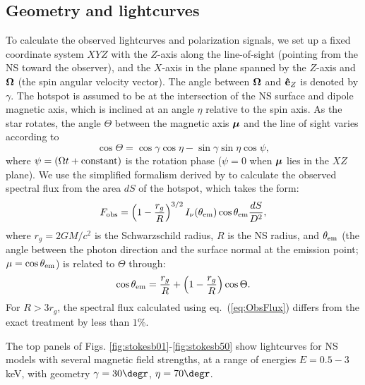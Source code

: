 \documentclass[useAMS,onecolumn,usenatbib,usegraphicx]{mn2e}
\def\be{\begin{equation}}
\def\ee{\end{equation}}
\begin{document}
\subsection{Geometry and lightcurves}
\label{subsect:LCurves}

\def\bmu{{\mbox{\boldmath $\mu$}}}

To calculate the observed lightcurves and polarization signals, we
set up a fixed coordinate system $XYZ$ with the $Z$-axis along the
line-of-sight (pointing from the NS toward the observer), 
and the $X$-axis in the plane spanned
by the $Z$-axis and ${\bf\Omega}$ (the spin angular velocity
vector). The angle between ${\bf\Omega}$ and ${\bf\hat{e}}_Z$ is denoted by
$\gamma$.  The hotspot is assumed to be at the intersection of the NS
surface and dipole magnetic axis, which is inclined at an angle $\eta$
relative to the spin axis.  As the star rotates, the angle $\Theta$ 
between the magnetic axis $\bmu$ and the line of sight varies according to
\be
\cos\Theta=\cos\gamma\cos\eta-\sin\gamma\sin\eta\cos\psi,
\label{eq:Theta}
\ee
where $\psi=(\Omega t+{\rm constant})$ is the rotation phase ($\psi=0$
when $\bmu$ lies in the $XZ$ plane).
We use the simplified formalism derived by \citet[][]{Beloborodov02a} to 
calculate the observed spectral flux from the area $dS$ of the hotspot, 
which takes the form:
\begin{eqnarray}
\label{eq:ObsFlux}
F_{\rm obs} = \left(1-{r_g\over R}\right)^{3/2}
I_{\nu}(\theta_{\rm em})\cos\theta_{\rm em} {dS\over D^2},
\end{eqnarray}
where $r_g=2GM/c^2$ is the Schwarzschild radius, $R$ is the NS radius, 
and $\theta_{\rm em}$ (the angle between the photon direction and the surface
normal at the emission point; $\mu=\cos\theta_{\rm em}$)
is related to $\Theta$ through:
\begin{eqnarray}
\label{eq:LBend}
\cos\theta_{\rm em}={r_g\over R}+\left(1-{r_g\over R}\right)\cos\Theta.
\end{eqnarray}
For $R>3 r_g$, the spectral flux calculated using eq.~(\ref{eq:ObsFlux})
differs from the exact treatment \citep[see][]{Pechenicketal83a} by
less than $1$\%.

The top panels of Figs. \ref{fig:stokesb01}-\ref{fig:stokesb50} show
lightcurves for NS models with several magnetic field strengths, at a
range of energies $E=0.5-3$ keV, with geometry $\gamma=30\degr$,
$\eta=70\degr$.  
\end{document}
